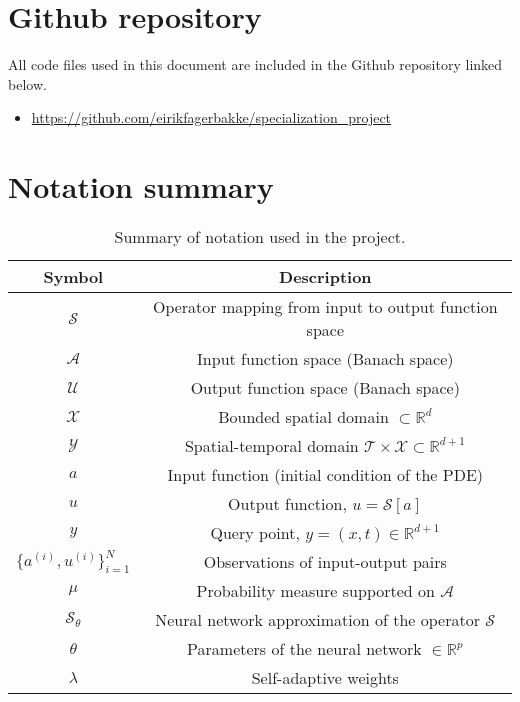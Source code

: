 \section*{Github repository}

All code files used in this document are included in the Github repository linked below.

\begin{itemize}
    \item \url{https://github.com/eirikfagerbakke/specialization_project}
\end{itemize}

\section*{Notation summary}
\begin{table}[h!]
\centering
\begin{tabular}{c|c}
\textbf{Symbol} & \textbf{Description} \\
\hline
\(\mathcal{S}\) & Operator mapping from input to output function space \\
\(\mathcal{A}\) & Input function space (Banach space) \\
\(\mathcal{U}\) & Output function space (Banach space) \\
\(\mathcal{X}\) & Bounded spatial domain \(\subset \mathbb{R}^d\) \\
\(\mathcal{Y}\) & Spatial-temporal domain \(\mathcal{T} \times \mathcal{X} \subset \mathbb{R}^{d+1}\) \\
\(a\) & Input function (initial condition of the PDE) \\
\(u\) & Output function, \(u = \mathcal{S}[a]\) \\
\(y\) & Query point, \(y = (x,t) \in \mathbb{R}^{d+1}\) \\
\(\{a^{(i)}, u^{(i)}\}_{i=1}^N\) & Observations of input-output pairs \\
\(\mu\) & Probability measure supported on \(\mathcal{A}\) \\
\(\mathcal{S}_\theta\) & Neural network approximation of the operator \(\mathcal{S}\) \\
\(\theta\) & Parameters of the neural network \(\in \mathbb{R}^p\) \\
\(\lambda\) & Self-adaptive weights
\end{tabular}
\caption{Summary of notation used in the project.}
\label{tab:notation}
\end{table}


